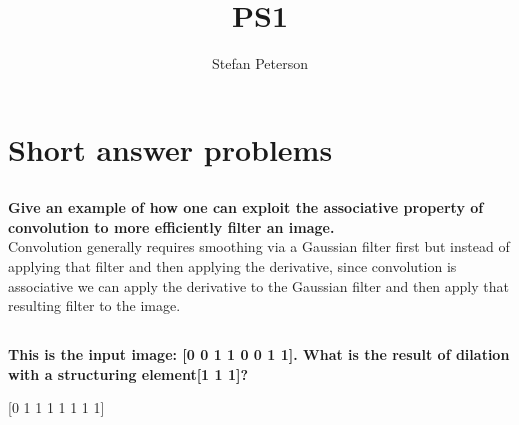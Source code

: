 \documentclass[11pt]{amsart}
\title{PS1}
\author{Stefan Peterson}
\date{}                                           %
\begin{document}
\raggedright
\maketitle	

\begingroup
\Huge\section{Short answer problems}
\endgroup

\subsection{}
\textbf{Give an example of how one can exploit the associative property of convolution to more efficiently filter an image.} \\
\vspace{5mm}
Convolution generally requires smoothing via a Gaussian filter first but instead of applying that filter and then applying the derivative, since convolution is associative we can apply the derivative to the Gaussian filter and then apply that resulting filter to the image.

\subsection{}
\textbf{This is the input image: [0 0 1 1 0 0 1 1]. What is the result of dilation with a structuring element[1 1 1]?} \\
\vspace{5mm}
\begin{center}
[0 1 1 1 1 1 1 1]
\end{center}
\end{document}
